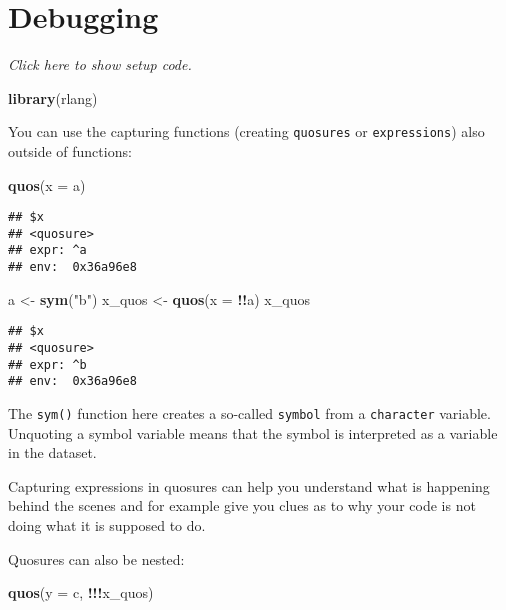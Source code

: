 \documentclass[]{book}
\newenvironment{Shaded}{\begin{snugshade}}{\end{snugshade}}
\newcommand{\DataTypeTok}[1]{\textcolor[rgb]{0.13,0.29,0.53}{#1}}
\newcommand{\KeywordTok}[1]{\textcolor[rgb]{0.13,0.29,0.53}{\textbf{#1}}}
\newcommand{\NormalTok}[1]{#1}
\newcommand{\OperatorTok}[1]{\textcolor[rgb]{0.81,0.36,0.00}{\textbf{#1}}}
\newcommand{\StringTok}[1]{\textcolor[rgb]{0.31,0.60,0.02}{#1}}
\begin{document}
\hypertarget{debugging}{%
\section{Debugging}\label{debugging}}

\emph{Click here to show setup code.}

\begin{Shaded}
\begin{Highlighting}[]
\KeywordTok{library}\NormalTok{(rlang)}
\end{Highlighting}
\end{Shaded}

You can use the capturing functions (creating \texttt{quosures} or \texttt{expressions}) also outside of functions:

\begin{Shaded}
\begin{Highlighting}[]
\KeywordTok{quos}\NormalTok{(}\DataTypeTok{x =}\NormalTok{ a)}
\end{Highlighting}
\end{Shaded}

\begin{verbatim}
## $x
## <quosure>
## expr: ^a
## env:  0x36a96e8
\end{verbatim}

\begin{Shaded}
\begin{Highlighting}[]
\NormalTok{a <-}\StringTok{ }\KeywordTok{sym}\NormalTok{(}\StringTok{"b"}\NormalTok{)}
\NormalTok{x_quos <-}\StringTok{ }\KeywordTok{quos}\NormalTok{(}\DataTypeTok{x =} \OperatorTok{!!}\NormalTok{a)}
\NormalTok{x_quos}
\end{Highlighting}
\end{Shaded}

\begin{verbatim}
## $x
## <quosure>
## expr: ^b
## env:  0x36a96e8
\end{verbatim}

The \texttt{sym()} function here creates a so-called \texttt{symbol} from a \texttt{character} variable.
Unquoting a symbol variable means that the symbol is interpreted as a variable in the dataset.

Capturing expressions in quosures can help you understand what is happening behind the scenes and for example give you clues as to why your code is not doing what it is supposed to do.

Quosures can also be nested:

\begin{Shaded}
\begin{Highlighting}[]
\KeywordTok{quos}\NormalTok{(}\DataTypeTok{y =}\NormalTok{ c, }\OperatorTok{!!!}\NormalTok{x_quos)}
\end{Highlighting}
\end{Shaded}
\end{document}
